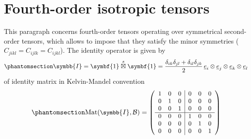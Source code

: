 \documentclass[
  a4paper,
  numbers=noendperiod,
  DIV=12]{scrreprt}
\newcommand{\uu}[1]{{\symbf{{#1}}}}
\newcommand{\uuuu}[1]{{\symbb{{#1}}}}
\newcommand{\uv}[1]{{\underline{{#1}}}}
\newcommand{\ve}[1]{{\uv{{e}}_{{#1}}}}
\newcommand{\sboxtimes}{\stackrel{s}{\boxtimes}}
\DeclareMathOperator{\Mat}{Mat}
\begin{document}
\section{Fourth-order isotropic tensors}\label{sec-ISO}

This paragraph concerns fourth-order tensors operating over symmetrical
second-order tensors, which allows to impose that they satisfy the minor
symmetries (\(C_{jikl}=C_{ijlk}=C_{ijkl}\)). The identity operator is
given by \begin{equation}\phantomsection\label{eq-tensI}{
\uuuu{I}=\uu{1}\sboxtimes\uu{1}=
\frac{\delta_{ik}\delta_{jl}+\delta_{il}\delta_{jk}}{2}\,\ve{i}\otimes\ve{j}\otimes\ve{k}\otimes\ve{l}
}\end{equation} of identity matrix in Kelvin-Mandel convention
\begin{equation}\phantomsection\label{eq-matI}{
\small
\Mat(\uuuu{I},\mathcal{B})=
   \left(
   \begin{array}{ccc|ccc}
   1 & 0 & 0 & 0 & 0 & 0 \\
   0 & 1 & 0 & 0 & 0 & 0 \\
   0 & 0 & 1 & 0 & 0 & 0 \\
   \hline
   0 & 0 & 0 & 1 & 0 & 0 \\
   0 & 0 & 0 & 0 & 1 & 0 \\
   0 & 0 & 0 & 0 & 0 & 1 \\
   \end{array}
   \right)
}\end{equation}
\end{document}

